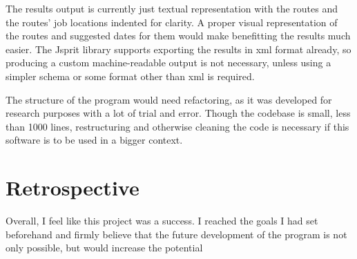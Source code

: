 The results output is currently just textual representation with the routes and the routes' job locations indented for clarity. A proper visual representation of the routes and suggested dates for them would make benefitting the results much easier. The Jsprit library supports exporting the results in xml format already, so producing a custom machine-readable output is not necessary, unless using a simpler schema or some format other than xml is required. 

The structure of the program would need refactoring, as it was developed for research purposes with a lot of trial and error. Though the codebase is small, less than 1000 lines, restructuring and otherwise cleaning the code is necessary if this software is to be used in a bigger context.


\section{Retrospective}

Overall, I feel like this project was a success. I reached the goals I had set beforehand and firmly believe that the future development of the program is not only possible, but would increase the potential 